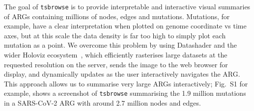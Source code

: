 \documentclass[unnumsec,webpdf,contemporary,large,namedate]{oup-authoring-template}%
\begin{document}
The goal of \texttt{tsbrowse} is to provide interpretable
and interactive visual summaries of ARGs containing millions of nodes, edges
and mutations. Mutations, for example, have a clear interpretation
when plotted on genome coordinate vs time axes, but at this scale
the data density is far too high to simply plot each mutation as a point.
We overcome this problem by using Datashader and the wider
Holoviz ecosystem~\citep{Holoviz}, which efficiently rasterises large datasets
at the requested resolution on the server, sends the image to the web browser
for display, and dynamically updates as the user interactively navigates the
ARG.
This approach allows us to summarise very large ARGs interactively;
Fig.~S1 for example, shows a screenshot of
\texttt{tsbrowse} summarising the 1.9 million mutations in a SARS-CoV-2
ARG with around 2.7 million nodes and edges.


\end{document}
